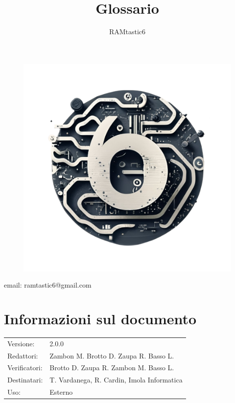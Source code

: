 \documentclass[12pt, oneside]{article}
\author{RAMtastic6}
\begin{document}
\thispagestyle{empty}
\title{Glossario}
\maketitle
\begin{figure}[h]
  \centering
  \includegraphics[scale=0.3]{logo.png}
\end{figure}
\begin{center}
    email: ramtastic6@gmail.com
\end{center}

\section*{Informazioni sul documento}
\begin{tabular}{ll}
Versione: & 2.0.0 \\
Redattori:  & Zambon M. Brotto D. Zaupa R. Basso L.\\
Verificatori: & Brotto D. Zaupa R. Zambon M. Basso L.\\ 
Destinatari: & T. Vardanega, R. Cardin, Imola Informatica \\
Uso: & Esterno
\end{tabular}
\newpage

\end{document}
